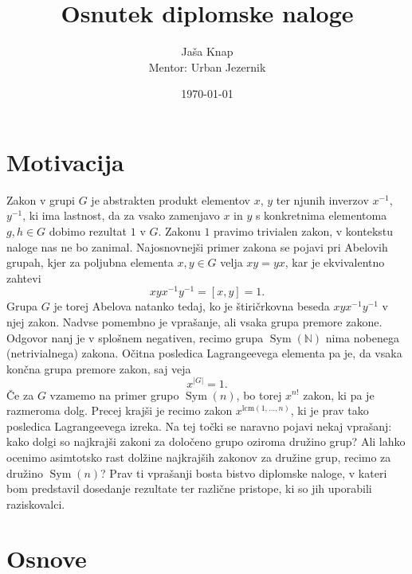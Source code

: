 \documentclass[12pt,a4paper]{article}
\title{Osnutek diplomske naloge}
\author{Jaša Knap\\[1mm]{\small Mentor: Urban Jezernik}}
\date{\today}
\begin{document}
\maketitle

\section{Motivacija}

Zakon v grupi $G$ je abstrakten produkt elementov $x$, $y$ ter njunih inverzov $x^{-1}$, $y^{-1}$, ki ima lastnost, da za vsako zamenjavo $x$ in $y$ s konkretnima
elementoma $g, h \in G$ dobimo rezultat $1$ v $G$. Zakonu $1$ pravimo trivialen zakon, v kontekstu naloge nas ne bo zanimal. Najosnovnejši primer zakona se pojavi pri Abelovih grupah, kjer za poljubna elementa $x,y \in  G$ velja $xy = yx$, kar je ekvivalentno
zahtevi \begin{equation*}
xyx^{-1}y^{-1} = [x,y] = 1.
\end{equation*}  
Grupa $G$ je torej Abelova natanko tedaj, ko je štiričrkovna beseda $xyx^{-1}y^{-1}$ v njej zakon. 
Nadvse pomembno je vprašanje, ali vsaka grupa premore zakone. Odgovor nanj je v splošnem negativen, recimo grupa $\operatorname{Sym}(\mathbb{N})$ nima nobenega (netrivialnega) zakona.
Očitna posledica Lagrangeevega elementa pa je, da vsaka končna grupa premore zakon, saj veja \begin{equation*}
x^{\lvert G \rvert } = 1.
\end{equation*}  
Če za $G$ vzamemo na primer grupo $\operatorname{Sym}(n)$, bo torej $x^{n!}$ zakon, ki pa je razmeroma dolg. Precej krajši je recimo zakon $x^{\text{lcm}(1, \ldots, n)}$, ki je prav tako posledica Lagrangeevega izreka. Na tej točki se naravno pojavi nekaj vprašanj:
kako dolgi so najkrajši zakoni za določeno grupo oziroma družino grup? Ali lahko ocenimo asimtotsko rast dolžine najkrajših zakonov za družine grup, recimo za družino $\operatorname{Sym}(n)$? Prav ti vprašanji bosta bistvo diplomske naloge, v kateri bom predstavil dosedanje rezultate ter različne pristope, ki so jih uporabili raziskovalci.

\section{Osnove}
\end{document}
